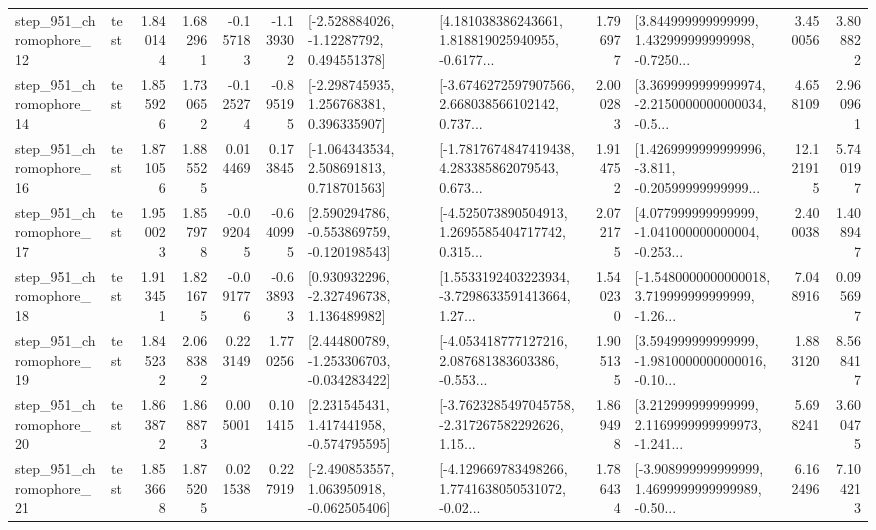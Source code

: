 \begin{tabular}{llrrrrllrlrr}
  step\_951\_chromophore\_12 &      test &      1.840144 &    1.682961 &     -0.157183 & -1.139302 &    [-2.528884026, -1.12287792, 0.494551378] &  [4.181038386243661, 1.818819025940955, -0.6177... &       1.796977 &  [3.844999999999999, 1.432999999999998, -0.7250... &            3.450056 &          3.808822 \\
  step\_951\_chromophore\_14 &      test &      1.855926 &    1.730652 &     -0.125274 & -0.895195 &    [-2.298745935, 1.256768381, 0.396335907] &  [-3.6746272597907566, 2.668038566102142, 0.737... &       2.000283 &  [3.3699999999999974, -2.2150000000000034, -0.5... &            4.658109 &          2.960961 \\
  step\_951\_chromophore\_16 &      test &      1.871056 &    1.885525 &      0.014469 &  0.173845 &    [-1.064343534, 2.508691813, 0.718701563] &  [-1.7817674847419438, 4.283385862079543, 0.673... &       1.914752 &  [1.4269999999999996, -3.811, -0.20599999999999... &           12.121915 &          5.740197 \\
  step\_951\_chromophore\_17 &      test &      1.950023 &    1.857978 &     -0.092045 & -0.640995 &   [2.590294786, -0.553869759, -0.120198543] &  [-4.525073890504913, 1.2695585404717742, 0.315... &       2.072175 &  [4.077999999999999, -1.041000000000004, -0.253... &            2.400038 &          1.408947 \\
  step\_951\_chromophore\_18 &      test &      1.913451 &    1.821675 &     -0.091776 & -0.638933 &    [0.930932296, -2.327496738, 1.136489982] &  [1.5533192403223934, -3.7298633591413664, 1.27... &       1.540230 &  [-1.5480000000000018, 3.719999999999999, -1.26... &            7.048916 &          0.095697 \\
  step\_951\_chromophore\_19 &      test &      1.845232 &    2.068382 &      0.223149 &  1.770256 &   [2.444800789, -1.253306703, -0.034283422] &  [-4.053418777127216, 2.087681383603386, -0.553... &       1.905135 &  [3.594999999999999, -1.9810000000000016, -0.10... &            1.883120 &          8.568417 \\
  step\_951\_chromophore\_20 &      test &      1.863872 &    1.868873 &      0.005001 &  0.101415 &    [2.231545431, 1.417441958, -0.574795595] &  [-3.7623285497045758, -2.317267582292626, 1.15... &       1.869498 &  [3.212999999999999, 2.1169999999999973, -1.241... &            5.698241 &          3.600475 \\
  step\_951\_chromophore\_21 &      test &      1.853668 &    1.875205 &      0.021538 &  0.227919 &   [-2.490853557, 1.063950918, -0.062505406] &  [-4.129669783498266, 1.7741638050531072, -0.02... &       1.786434 &  [-3.908999999999999, 1.4699999999999989, -0.50... &            6.162496 &          7.104213 \\

\end{tabular}
